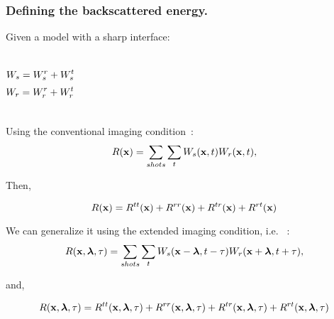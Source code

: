 \begin{frame} \frametitle{Defining the backscattered energy.}

Given a model with a sharp interface:
\begin{columns}

\[
{W_s}= {W_s^r} + {W_s^t}
\]
\vspace{0.8in}
\[
{W_r}= {W_r^r} + {W_r^t}
\]
\end{columns}

\end{frame}

\begin{frame} 
Using the conventional imaging condition~\cite{claerbout:467}:
\[
R({\bf x})= \sum_{shots} \sum_t {W_s}({\bf x},t) {W_r}({\bf x},t),
\]

Then,

\[
R({\bf x}) = R^{tt}({\bf x}) +R^{rr}({\bf x})+ R^{tr}({\bf x})+ R^{rt}({\bf x})
\label{eq:cases}
\]
\cite{liu:S29}
\end{frame}



\begin{frame}
We can generalize it using the extended imaging condition, i.e. ~\cite{sava:S209}:
\[
R({\bf x},{\boldsymbol{\lambda}},\tau) =  \sum_{shots} \sum_t {W_s}({\bf x}-{\boldsymbol{\lambda}},t-\tau) {W_r}({\bf x}+{\boldsymbol{\lambda}},t+\tau),
\]

and,

\[
R({\bf x},{\boldsymbol{\lambda}},\tau) = R^{tt}({\bf x},{\boldsymbol{\lambda}},\tau) +R^{rr}({\bf x},{\boldsymbol{\lambda}},\tau)+ R^{tr}({\bf x},{\boldsymbol{\lambda}},\tau)+ R^{rt}({\bf x},{\boldsymbol{\lambda}},\tau)
\]
\end{frame}



 \begin{frame} 

 \begin{columns} 
      \vspace{-.2in}
      \vspace{.4in}
      \vspace{.2in}
      \vspace{-.1in}
 
   \end{columns}
\end{frame}

